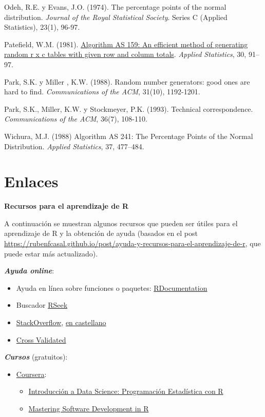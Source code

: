 \documentclass[
]{book}
\theoremstyle{break}
\theoremstyle{definition}
\theoremstyle{definition}
\theoremstyle{definition}
\theoremstyle{remark}
\begin{document}
Odeh, R.E. y Evans, J.O. (1974). The percentage points of the normal distribution. \emph{Journal of the Royal Statistical Society}. Series C (Applied Statistics), 23(1), 96-97.

Patefield, W.M. (1981). \href{https://doi.org/10.2307/2346669}{Algorithm AS 159: An efficient method of generating random r x c tables with given row and column totals}. \emph{Applied Statistics}, 30, 91--97.

Park, S.K. y Miller , K.W. (1988). Random number generators: good ones are hard to find. \emph{Communications of the ACM}, 31(10), 1192-1201.

Park, S.K., Miller, K.W. y Stockmeyer, P.K. (1993). Technical correspondence. \emph{Communications of the ACM}, 36(7), 108-110.

Wichura, M.J. (1988) Algorithm AS 241: The Percentage Points of the Normal Distribution. \emph{Applied Statistics}, 37, 477--484.

\hypertarget{appendix-apendices}{%
\appendix}


\hypertarget{links}{%
\chapter{Enlaces}\label{links}}

\textbf{Recursos para el aprendizaje de R}

A continuación se muestran algunos recursos que pueden ser útiles para el aprendizaje de R y la obtención de ayuda
(basados en el post \url{https://rubenfcasal.github.io/post/ayuda-y-recursos-para-el-aprendizaje-de-r},
que puede estar más actualizado).

\textbf{\emph{Ayuda online}}:

\begin{itemize}
\item
  Ayuda en línea sobre funciones o paquetes: \href{https://www.rdocumentation.org/}{RDocumentation}
\item
  Buscador \href{http://rseek.org/}{RSeek}
\item
  \href{http://stackoverflow.com/questions/tagged/r}{StackOverflow}, \href{https://es.stackoverflow.com/questions/tagged/r}{en castellano}
\item
  \href{https://stats.stackexchange.com}{Cross Validated}
\end{itemize}

\textbf{\emph{Cursos}} (gratuitos):

\begin{itemize}
\item
  \href{https://www.coursera.org/}{Coursera}:

  \begin{itemize}
  \item
    \href{https://www.coursera.org/learn/intro-data-science-programacion-estadistica-r}{Introducción a Data Science: Programación Estadística con R}
  \item
    \href{https://www.coursera.org/specializations/r}{Mastering Software Development in R}
  \end{itemize}
\end{itemize}
\end{document}
